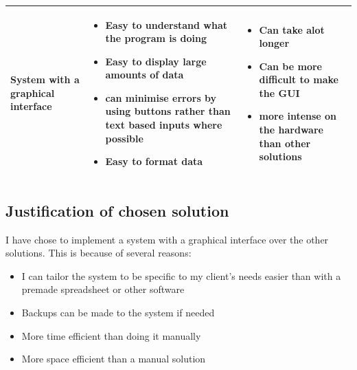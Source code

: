 \begin{center}
\begin{tabular}{|p{2cm}|p{4.5cm}|p{4.5cm}|}
	System with a graphical interface & \begin{itemize} \item Easy to understand what the program is doing \item Easy to display large amounts of data \item can minimise errors by using buttons rather than text based inputs where possible \item Easy to format data \end{itemize} & \begin{itemize} \item Can take alot longer \item Can be more difficult to make the GUI \item more intense on the hardware than other solutions \end{itemize}\\ \hline
\end{tabular}
\end{center}
\subsection{Justification of chosen solution}
I have chose to implement a system with a graphical interface over the other solutions. This is because of several reasons:
\begin{itemize}
	\item I can tailor the system to be specific to my client's needs easier than with a premade spreadsheet or other software
	\item Backups can be made to the system if needed
	\item More time efficient than doing it manually
	\item More space efficient than a manual solution
\end{itemize}